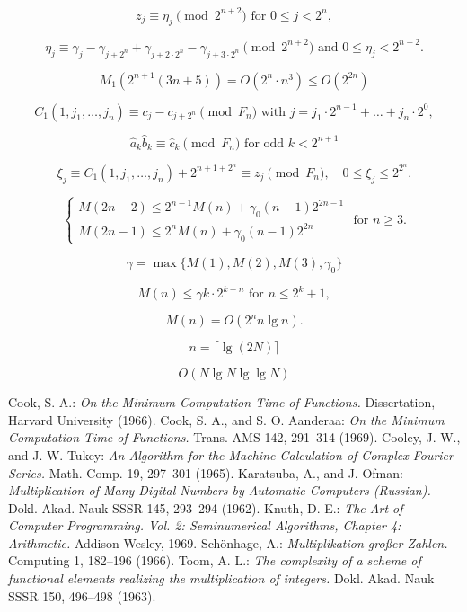 \documentclass{article}
\begin{document}
\[
\tag{4.14}
z_j \equiv \eta_j \pmod{2^{n + 2}}\text{ for }0 \le j < 2^n,
\]

\[
\eta_j \equiv \gamma_j - \gamma_{j + 2^n} + \gamma_{j + 2 \cdot 2^n} - \gamma_{j + 3 \cdot 2^n} \pmod{2^{n + 2}}\text{ and }0 \le \eta_j < 2^{n + 2}.
\]

\[
M_1(2^{n + 1} (3n + 5)) = O(2^n \cdot n^3) \le O(2^{2n})
\]

\[
C_1(1, j_1, \ldots, j_n) \equiv c_j - c_{j + 2^n} \pmod{F_n}\text{ with }j = j_1 \cdot 2^{n - 1} + \ldots + j_n \cdot 2^0,
\]

\[
\hat{a}_k \hat{b}_k \equiv \hat{c}_k \pmod{F_n}\text{ for odd }k < 2^{n + 1}
\]

\[
\xi_j \equiv C_1(1, j_1, \ldots, j_n) + 2^{n + 1 + 2^n} \equiv z_j \pmod{F_n}, \quad 0 \le \xi_j \le 2^{2^n}.
\]

\[
\tag{4.15}
\begin{cases}
M(2n - 2) \le 2^{n - 1} M(n) + \gamma_0 (n - 1) 2^{2n - 1} \\
M (2n - 1) \le 2^n M(n) + \gamma_0 (n - 1) 2^{2n}
\end{cases} \text{ for } n \ge 3.
\]

\[
\gamma = \max \{M(1), M(2), M(3), \gamma_0\}
\]

\[
M(n) \le \gamma k \cdot 2^{k + n}\text{ for } n \le 2^k + 1,
\]

\[
M(n) = O(2^n n \lg n).
\]

\[
n = \lceil \lg(2N)\rceil
\]

\[
O(N \lg N \lg \lg N)
\]

\begin{thebibliography}{99}
 Cook, S. A.: \textit{On the Minimum Computation Time of Functions.} Dissertation, Harvard University (1966).
 Cook, S. A., and S. O. Aanderaa: \textit{On the Minimum Computation Time of Functions.} Trans. AMS 142, 291--314 (1969).
 Cooley, J. W., and J. W. Tukey: \textit{An Algorithm for the Machine Calculation of Complex Fourier Series.} Math. Comp. 19, 297--301 (1965).
 Karatsuba, A., and J. Ofman: \textit{Multiplication of Many-Digital Numbers by Automatic Computers (Russian).} Dokl. Akad. Nauk SSSR 145, 293--294 (1962).
 Knuth, D. E.: \textit{The Art of Computer Programming. Vol. 2: Seminumerical Algorithms, Chapter 4: Arithmetic.} Addison-Wesley, 1969.
 Schönhage, A.: \textit{Multiplikation großer Zahlen.} Computing 1, 182--196 (1966).
 Toom, A. L.: \textit{The complexity of a scheme of functional elements realizing the multiplication of integers.} Dokl. Akad. Nauk SSSR 150, 496--498 (1963).
\end{thebibliography}
\end{document}
